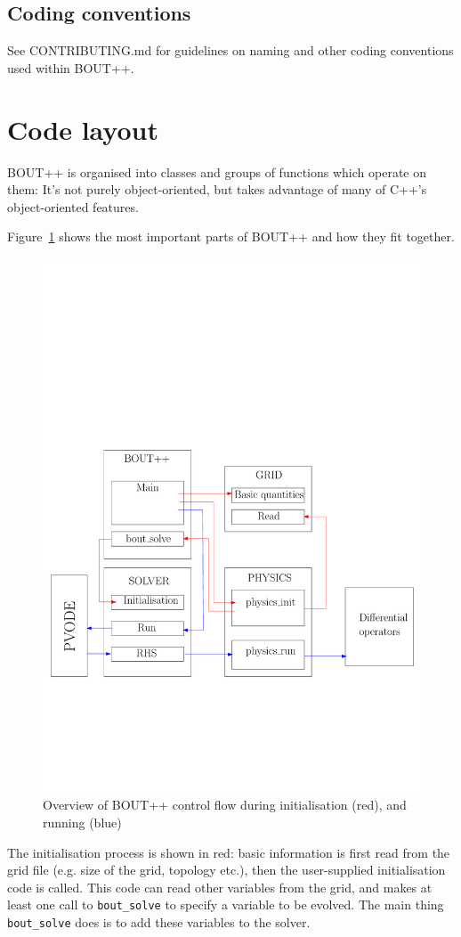 \documentclass[12pt]{article}
\newcommand{\code}[1]{\texttt{#1}}
\begin{document}
\subsection{Coding conventions}

See CONTRIBUTING.md for guidelines on naming and other coding conventions used
within BOUT++.

\section{Code layout}

BOUT++ is organised into classes and groups of functions which operate on them: 
It's not purely object-oriented, but takes advantage of many of C++'s object-oriented features. 

Figure~\ref{fig:layout1} shows the most important parts of BOUT++ and how they fit together.
\begin{figure}[htbp!]
\centering
\includegraphics[width=0.7\paperwidth, keepaspectratio]{figs/layout1.pdf}
\caption{Overview of BOUT++ control flow during initialisation (red), and running (blue)}
\label{fig:layout1}
\end{figure}
The initialisation process is shown in red: basic information is first read from the grid
file (e.g. size of the grid, topology etc.), then the user-supplied initialisation
code is called. This code can read other variables from the grid, and makes at least
one call
to \code{bout\_solve} to specify a variable to be evolved. The main thing \code{bout\_solve}
does is to add these variables to the solver. 
\end{document}
